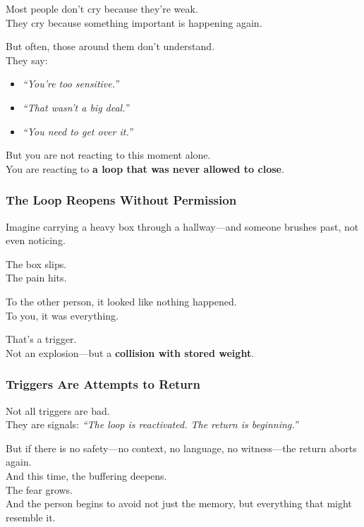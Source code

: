 Most people don't cry because they're weak.\\
They cry because something important is happening again.

But often, those around them don't understand.\\
They say:

\begin{itemize}
\item
  \emph{``You're too sensitive.''\\
  }
\item
  \emph{``That wasn't a big deal.''\\
  }
\item
  \emph{``You need to get over it.''\\
  }
\end{itemize}

But you are not reacting to this moment alone.\\
You are reacting to \textbf{a loop that was never allowed to close}.

\subsubsection{\texorpdfstring{\textbf{The Loop Reopens Without
Permission}}{The Loop Reopens Without Permission}}\label{the-loop-reopens-without-permission}

Imagine carrying a heavy box through a hallway---and someone brushes
past, not even noticing.

The box slips.\\
The pain hits.

To the other person, it looked like nothing happened.\\
To you, it was everything.

That's a trigger.\\
Not an explosion---but a \textbf{collision with stored weight}.

\subsubsection{\texorpdfstring{\textbf{Triggers Are Attempts to
Return}}{Triggers Are Attempts to Return}}\label{triggers-are-attempts-to-return}

Not all triggers are bad.\\
They are signals: \emph{``The loop is reactivated. The return is
beginning.''}

But if there is no safety---no context, no language, no witness---the
return aborts again.\\
And this time, the buffering deepens.\\
The fear grows.\\
And the person begins to avoid not just the memory, but everything that
might resemble it.

